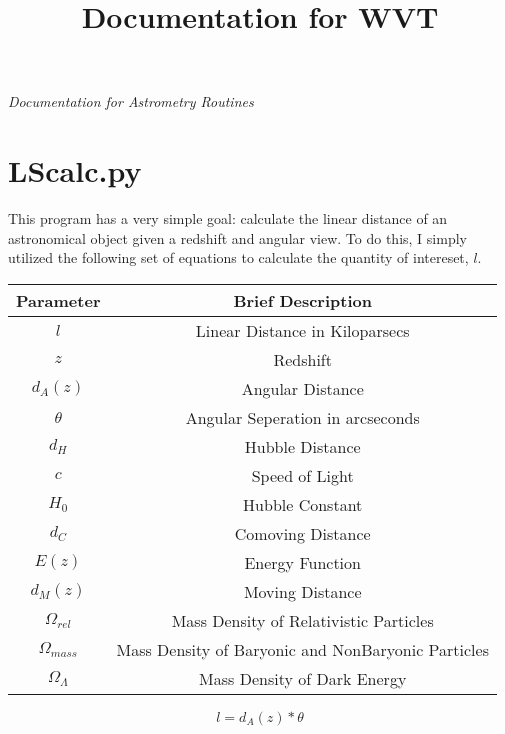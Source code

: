 \documentclass[11pt,letterpaper]{article}
\begin{document}
	\univlogo
	
	\title{Documentation for WVT}
	
	\textit{Documentation for Astrometry Routines}
	
	\tableofcontents
	
	\newpage
	
	
	\newpage
\section{LScalc.py}
This program has a very simple goal: calculate the linear distance of an astronomical object given a redshift and angular view. To do this, I simply utilized the following set of equations to calculate the quantity of intereset, $l$.
\begin{center}
	\begin{tabular}{|c|c|}
		\hline 
		Parameter & Brief Description \\ 
		\hline 
		$l$ & Linear Distance in Kiloparsecs \\ 
		\hline 
		$z$ & Redshift \\
		\hline
		$d_A(z)$ & Angular Distance \\
		\hline 
		$\theta$ & Angular Seperation in arcseconds \\
		\hline
		$d_H$ & Hubble Distance \\
		\hline
		$c$ & Speed of Light \\
		\hline
		$H_0$ & Hubble Constant \\
		\hline
		$d_C$ & Comoving Distance \\
		\hline 
		$E(z)$ & Energy Function \\
		\hline 
		$d_M(z)$ & Moving Distance \\
		\hline 
		$\Omega_{rel}$ & Mass Density of Relativistic Particles \\
		\hline
		$\Omega_{mass}$ & Mass Density of Baryonic and NonBaryonic Particles \\
		\hline
		$\Omega_{\Lambda}$ & Mass Density of Dark Energy \\
		\hline
	\end{tabular} 
\end{center}



\begin{equation}
l = d_A(z)*\theta
\end{equation}
\end{document}
